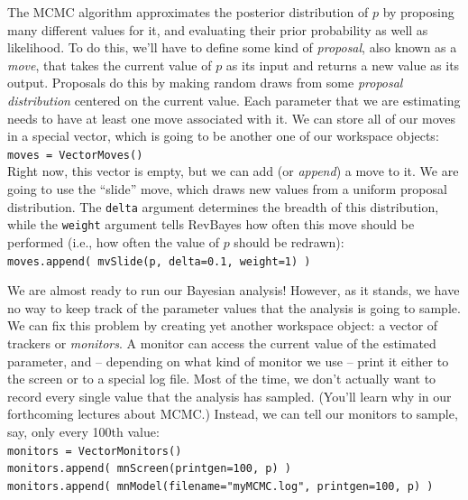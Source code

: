 \documentclass[12pt]{article}
\begin{document}
\noindent The MCMC algorithm approximates the posterior distribution of $p$ by proposing many different values for it, and evaluating their prior probability as well as likelihood. To do this, we'll have to define some kind of \textit{proposal}, also known as a \textit{move}, that takes the current value of $p$ as its input and returns a new value as its output. Proposals do this by making random draws from some \textit{proposal distribution} centered on the current value. Each parameter that we are estimating needs to have at least one move associated with it. We can store all of our moves in a special vector, which is going to be another one of our workspace objects: \\

\indent \texttt{moves = VectorMoves()} \\

\noindent Right now, this vector is empty, but we can add (or \textit{append}) a move to it. We are going to use the ``slide'' move, which draws new values from a uniform proposal distribution. The \texttt{delta} argument determines the breadth of this distribution, while the \texttt{weight} argument tells RevBayes how often this move should be performed (i.e., how often the value of $p$ should be redrawn): \\

\indent \texttt{moves.append( mvSlide(p, delta=0.1, weight=1) )}

\newpage

\noindent We are almost ready to run our Bayesian analysis! However, as it stands, we have no way to keep track of the parameter values that the analysis is going to sample. We can fix this problem by creating yet another workspace object: a vector of trackers or \textit{monitors}. A monitor can access the current value of the estimated parameter, and -- depending on what kind of monitor we use -- print it either to the screen or to a special log file. Most of the time, we don't actually want to record every single value that the analysis has sampled. (You'll learn why in our forthcoming lectures about MCMC.) Instead, we can tell our monitors to sample, say, only every 100th value: \\

\indent \texttt{monitors = VectorMonitors()} \\
\indent \texttt{monitors.append( mnScreen(printgen=100, p) )} \\
\indent \texttt{monitors.append( mnModel(filename="myMCMC.log", printgen=100, p) )} \\
\end{document}
